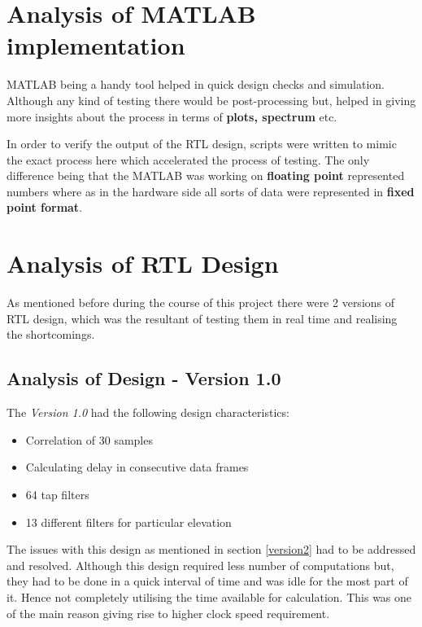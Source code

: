 \documentclass[BTech]{nitkdiss}
\begin{document}
\section{Analysis of MATLAB implementation}

MATLAB being a handy tool helped in quick design checks and simulation. Although any kind of testing there would be post-processing but, helped in giving more insights about the process in terms of \textbf{plots, spectrum} etc. 

In order to verify the output of the RTL design, scripts were written to mimic the exact process here which accelerated the process of testing. The only difference being that the MATLAB was working on \textbf{floating point} represented numbers where as in the hardware side all sorts of data were represented in \textbf{fixed point format}. 

\section{Analysis of RTL Design}

As mentioned before during the course of this project there were 2 versions of RTL design, which was the resultant of testing them in real time and realising the shortcomings. 

\subsection{Analysis of Design - Version 1.0}

The \textit{Version 1.0} had the following design characteristics:

\begin{itemize}
    \item Correlation of 30 samples
    \item Calculating delay in consecutive data frames
    \item 64 tap filters 
    \item 13 different filters for particular elevation 
\end{itemize}

The issues with this design as mentioned in section \ref{version2} had to be addressed and resolved. Although this design required less number of computations but, they had to be done in a quick interval of time and was idle for the most part of it. Hence not completely utilising the time available for calculation. This was one of the main reason giving rise to higher clock speed requirement. 
\end{document}
